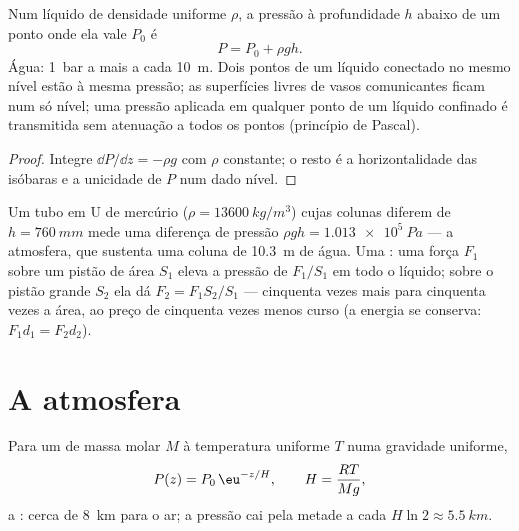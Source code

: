 \begin{corollary}\label{cor:b1:fluid-statics:incompressible}
Num líquido de densidade uniforme $\rho$, a pressão à profundidade $h$
abaixo de um ponto onde ela vale $P_0$ é
\[
P = P_0 + \rho gh .
\]
Água: \qty{1}{bar} a mais a cada \qty{10}{m}. Dois pontos de um líquido
conectado no mesmo nível estão à mesma pressão; as superfícies livres de
vasos comunicantes ficam num só nível; uma pressão aplicada em qualquer
ponto de um líquido confinado é transmitida sem atenuação a todos os
pontos (princípio de Pascal).
\end{corollary}

\begin{proof}
Integre $\dd P/\dd z = -\rho g$ com $\rho$ constante; o resto é a
horizontalidade das isóbaras e a unicidade de $P$ num dado nível.
\end{proof}

\begin{example}\label{ex:b1:fluid-statics:manometer}
Um tubo em U de mercúrio ($\rho = \qty{13600}{kg/m^3}$) cujas colunas diferem de
$h = \qty{760}{mm}$ mede uma diferença de pressão $\rho gh = \qty{1.013e5}{Pa}$
--- a atmosfera, que sustenta uma coluna de \qty{10.3}{m} de água. Uma
: uma força $F_1$ sobre um pistão de área $S_1$ eleva a
pressão de $F_1/S_1$ em todo o líquido; sobre o pistão grande $S_2$ ela dá
$F_2 = F_1S_2/S_1$ --- cinquenta vezes mais para cinquenta vezes a área, ao
preço de cinquenta vezes menos curso (a energia se conserva: $F_1d_1 = F_2d_2$).
\end{example}

\section{A atmosfera}

\begin{proposition}\label{prop:b1:fluid-statics:atmosphere}
Para um  de massa molar $M$ à temperatura uniforme $T$ numa
gravidade uniforme,
\[
P(z) = P_0\,\eu^{-z/H}, \qquad H = \frac{RT}{Mg} ,
\]
a \emph{}: cerca de \qty{8}{km} para o ar; a pressão cai pela
metade a cada $H\ln2 \approx \qty{5.5}{km}$.
\end{proposition}

